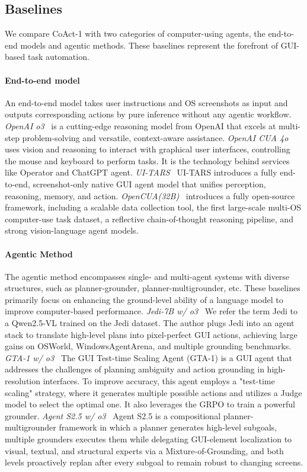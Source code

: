 \documentclass{article} %
\newcommand{\ours}{CoAct-1\xspace}
\begin{document}
\subsection{Baselines}
We compare \ours with two categories of computer-using agents,  the end-to-end models and agentic methods. These baselines represent the forefront of GUI-based task automation.
\paragraph{End-to-end model}
An end-to-end model takes user instructions and OS screenshots as input and outputs corresponding actions by pure inference without any agentic workflow. \textit{OpenAI o3}~\citep{openAI_o3_o4_mini} is a cutting-edge reasoning model from OpenAI that excels at multi-step problem-solving and versatile, context-aware assistance. \textit{OpenAI CUA 4o}~\citep{cua2025} uses vision and reasoning to interact with graphical user interfaces, controlling the mouse and keyboard to perform tasks. It is the technology behind services like Operator and ChatGPT agent. \textit{UI-TARS}~\citep{qin2025ui} UI-TARS introduces a fully end-to-end, screenshot-only native GUI agent model that unifies perception, reasoning, memory, and action. \textit{OpenCUA(32B)}~\citep{wang2025opencua} introduces a fully open-source framework, including a scalable data collection tool, the first large-scale multi-OS computer-use task dataset, a reflective chain-of-thought reasoning pipeline, and strong vision-language agent models.

\paragraph{Agentic Method}
The agentic method encompasses single- and multi-agent systems with diverse structures, such as planner-grounder, planner-multigrounder, etc. These baselines primarily focus on enhancing the ground-level ability of a language model to improve computer-based performance. \textit{Jedi-7B w/ o3~\citep{xie2025scaling}} We refer the term Jedi to a Qwen2.5-VL trained on the Jedi dataset. The author plugs Jedi into an agent stack to translate high-level plans into pixel-perfect GUI actions, achieving large gains on OSWorld, WindowsAgentArena, and multiple grounding benchmarks. \textit{GTA-1 w/ o3~\citep{yang2025gta1guitesttimescaling}} The GUI Test-time Scaling Agent (GTA-1) is a GUI agent that addresses the challenges of planning ambiguity and action grounding in high-resolution interfaces. To improve accuracy, this agent employs a "test-time scaling" strategy, where it generates multiple possible actions and utilizes a Judge model to select the optimal one. It also leverages the GRPO to train a powerful grounder. \textit{Agent S2.5 w/ o3~\citep{agashe2025agent}} Agent S2.5 is a compositional planner-multigrounder framework in which a planner generates high-level subgoals, multiple grounders executes them while delegating GUI-element localization to visual, textual, and structural experts via a Mixture-of-Grounding, and both levels proactively replan after every subgoal to remain robust to changing screens.
\end{document}
